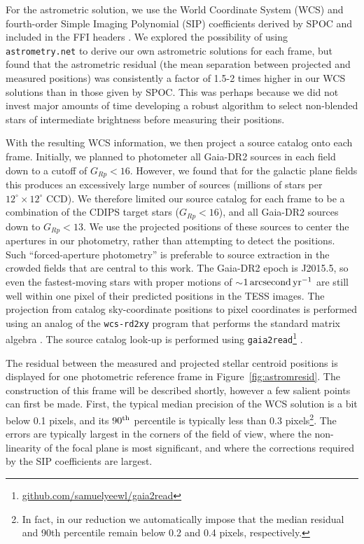 \documentclass[12pt,twocolumn,tighten]{aastex62}
\begin{document}
For the astrometric solution, we use the World Coordinate System (WCS)
and fourth-order Simple Imaging Polynomial (SIP) coefficients
derived by SPOC and included in the FFI headers
\citep[][Sec.~8]{pence_fits_2010}.  We explored the possibility of
using \texttt{astrometry.net} \citep{lang_2010} to derive our own
astrometric solutions for each frame, but found that the astrometric
residual (the mean separation between projected and measured
positions) was consistently a factor of 1.5-2 times higher in our WCS
solutions than in those given by SPOC.  This was perhaps because
we did not invest major amounts of time developing a robust
algorithm to select non-blended stars of intermediate brightness before
measuring their positions.

With the resulting WCS information, we then project a source catalog
onto each frame.  Initially, we planned to photometer all Gaia-DR2
sources in each field down to a cutoff of $G_{Rp} < 16$.  However, we
found that for the galactic plane fields this produces an excessively
large number of sources (millions of stars per
$12^\circ\times12^\circ$ CCD).  We therefore limited our source
catalog for each frame to be
a combination of the CDIPS target stars ($G_{Rp} < 16$), and
all Gaia-DR2 sources down to $G_{Rp} < 13$.  We use the
projected positions of these sources to center the apertures in our
photometry,
rather than attempting to detect the positions.  Such
``forced-aperture photometry'' is preferable to source
extraction in the crowded fields that are central to this work.  The
Gaia-DR2 epoch is J2015.5, so even the fastest-moving stars with
proper motions of $\sim$$1\,{\rm arcsecond}\,{\rm yr}^{-1}$ are still
well within one pixel of their predicted positions in the TESS images.
The projection from catalog sky-coordinate positions to pixel
coordinates is performed using an analog of the \texttt{wcs-rd2xy}
program that performs the standard matrix algebra \citep{lang_2010}.
The source catalog look-up is performed using
\texttt{gaia2read}\footnote{\url{github.com/samuelyeewl/gaia2read}}
\citep{kim_2018_gaia2read}.

The residual between the measured and projected stellar centroid
positions is displayed for one photometric reference frame in
Figure~\ref{fig:astromresid}.
The construction of this frame will be described shortly, however
a few salient points can first be made.
First, the typical median precision of the WCS solution is a bit below
0.1 pixels, and its $90^{\rm th}$ percentile is typically less than
0.3 pixels\footnote{In fact, in our reduction we automatically impose
that the median residual and 90th percentile remain below 0.2 and 0.4
pixels, respectively.}.
The errors are typically largest in the corners of the field of view,
where the non-linearity of the focal plane is most significant, and
where the corrections required by the SIP coefficients are largest.
\end{document}
